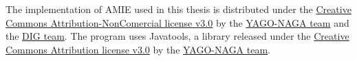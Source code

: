 The implementation of AMIE used in this thesis is distributed under the \hyperlink{https://creativecommons.org/licenses/by-nc/3.0/}{Creative Commons Attribution-NonComercial license v3.0} by the \hyperlink{https://www.mpi-inf.mpg.de/departments/databases-and-information-systems/research/yago-naga/amie/}{YAGO-NAGA team} and the \hyperlink{https://dig.telecom-paris.fr/blog/}{DIG team}. The program uses Javatools, a library released under the \hyperlink{https://creativecommons.org/licenses/by/3.0/}{Creative Commons Attribution license v3.0} by the \hyperlink{https://www.mpi-inf.mpg.de/departments/databases-and-information-systems/research/yago-naga/amie/}{YAGO-NAGA team}.

